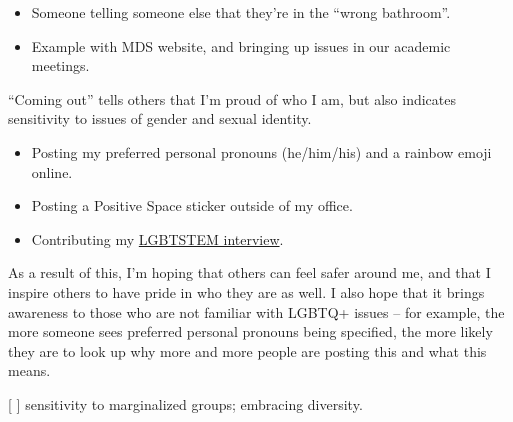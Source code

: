 \documentclass[]{article}
\providecommand{\tightlist}{%
  \setlength{\itemsep}{0pt}\setlength{\parskip}{0pt}}
\begin{document}
\begin{itemize}
\tightlist
\item
  Someone telling someone else that they're in the ``wrong bathroom''.
\item
  Example with MDS website, and bringing up issues in our academic meetings.
\end{itemize}

``Coming out'' tells others that I'm proud of who I am, but also indicates sensitivity to issues of gender and sexual identity.

\begin{itemize}
\tightlist
\item
  Posting my preferred personal pronouns (he/him/his) and a rainbow emoji online.
\item
  Posting a Positive Space sticker outside of my office.
\item
  Contributing my \href{https://lgbtstem.wordpress.com/2019/11/09/an-interview-with-vincenzo-coia/}{LGBTSTEM interview}.
\end{itemize}

As a result of this, I'm hoping that others can feel safer around me, and that I inspire others to have pride in who they are as well. I also hope that it brings awareness to those who are not familiar with LGBTQ+ issues -- for example, the more someone sees preferred personal pronouns being specified, the more likely they are to look up why more and more people are posting this and what this means.

{[} {]} sensitivity to marginalized groups; embracing diversity.
\end{document}
